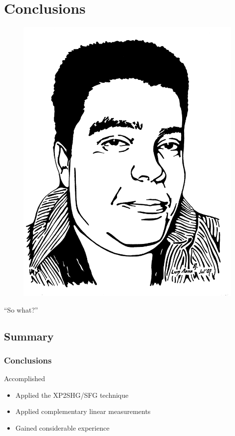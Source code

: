 \documentclass{beamer}
\begin{document}
\section{Conclusions}
\begin{frame}
\begin{center}
\begin{figure}
\includegraphics[height=0.87\textheight]{cabellos}
\end{figure}
{\huge ``So what?''}
\end{center}
\end{frame}

\subsection{Summary}
\begin{frame}
\frametitle{Conclusions}
\begin{block}{Accomplished}
\begin{itemize}
\item Applied the XP2SHG/SFG technique
\item Applied complementary linear measurements
\item Gained considerable experience
\end{itemize}
\end{block}
\end{frame}
\end{document}
